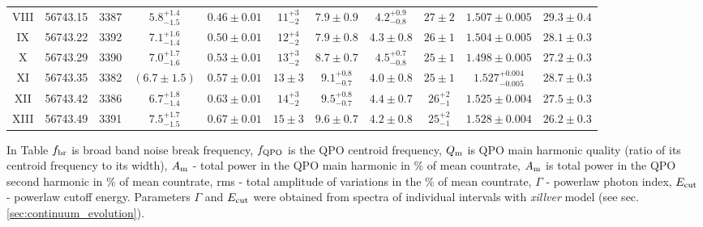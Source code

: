 \documentclass[a4paper,fleqn,usenatbib]{mnras}
\begin{document}
\begin{table}
\begin{tabular}{|c|c|c|c|c|c|c|c|c|c|c|}
VIII & 56743.15 & 3387 & $5.8_{-1.5}^{+1.4}$ & $0.46\pm0.01$ & $11_{-2}^{+3}$ & $7.9\pm0.9$ & $4.2_{-0.8}^{+0.9}$ & $27\pm2$ & $1.507\pm0.005$ & $29.3\pm0.4$ \\
IX & 56743.22 & 3392 & $7.1_{-1.4}^{+1.6}$ & $0.50\pm0.01$ & $12_{-2}^{+4}$ & $7.9\pm0.8$ & $4.3\pm0.8$ & $26\pm1$ & $1.504\pm0.005$ & $28.1\pm0.3$ \\
X & 56743.29 & 3390 & $7.0_{-1.6}^{+1.7}$ & $0.53\pm0.01$ & $13_{-2}^{+3}$ & $8.7\pm0.7$ & $4.5_{-0.8}^{+0.7}$ & $25\pm1$ & $1.498\pm0.005$ & $27.2\pm0.3$ \\
XI & 56743.35 & 3382 & $(6.7\pm1.5)$ & $0.57\pm0.01$ & $13\pm3$ & $9.1_{-0.7}^{+0.8}$ & $4.0\pm0.8$ & $25\pm1$ & $1.527_{-0.005}^{+0.004}$ & $28.7\pm0.3$ \\
XII & 56743.42 & 3386 & $6.7_{-1.4}^{+1.8}$ & $0.63\pm0.01$ & $14_{-2}^{+3}$ & $9.5_{-0.7}^{+0.8}$ & $4.4\pm0.7$ & $26_{-1}^{+2}$ & $1.525\pm0.004$ & $27.5\pm0.3$ \\
XIII & 56743.49 & 3391 & $7.5_{-1.5}^{+1.7}$ & $0.67\pm0.01$ & $15\pm3$ & $9.6\pm0.7$ & $4.2\pm0.8$ & $25_{-1}^{+2}$ & $1.528\pm0.004$ & $26.2\pm0.3$ \\
\hline
\end{tabular}
\begin{flushleft}
        In Table $f_{\rm br}$ is broad band noise break frequency, $f_{\rm QPO}$ is the QPO centroid frequency, $Q_{\rm m}$ is QPO main harmonic quality (ratio of its centroid frequency to its width), $A_{\rm m}$ - total power in the QPO main harmonic in \% of mean countrate, $A_{\rm m}$ is total power in the QPO second harmonic in \% of mean countrate, rms - total amplitude of variations in the \% of mean countrate, $\Gamma$ - powerlaw photon index, $E_{\rm cut}$ - powerlaw cutoff energy. Parameters $\Gamma$ and $E_{\rm cut}$ were obtained from spectra of individual intervals with {\it xillver} model (see sec.\ref{sec:continuum_evolution}).
\end{flushleft}
\end{table}
\end{document}
